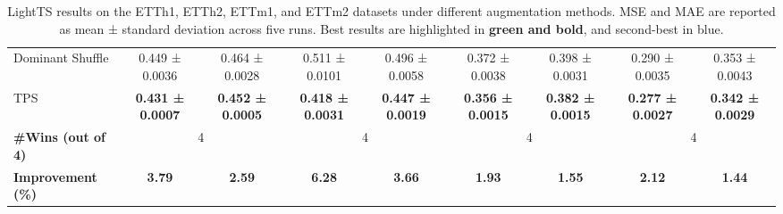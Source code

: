 \begin{table}[h!]
\begin{adjustbox}{max width=\textwidth}
\begin{tabular}{l|cc|cc|cc|cc}
        Dominant Shuffle   & 0.449 ± 0.0036 & \cellcolor{secondcolor}0.464 ± 0.0028 & 0.511 ± 0.0101 & 0.496 ± 0.0058 & 0.372 ± 0.0038 & 0.398 ± 0.0031 & 0.290 ± 0.0035 & 0.353 ± 0.0043  \\
    TPS           & \cellcolor{bestcolor}\textbf{0.431 ± 0.0007} & \cellcolor{bestcolor}\textbf{0.452 ± 0.0005} & \cellcolor{bestcolor}\textbf{0.418 ± 0.0031} & \cellcolor{bestcolor}\textbf{0.447 ± 0.0019} & \cellcolor{bestcolor}\textbf{0.356 ± 0.0015} & \cellcolor{bestcolor}\textbf{0.382 ± 0.0015} & \cellcolor{bestcolor}\textbf{0.277 ± 0.0027} & \cellcolor{bestcolor}\textbf{0.342 ± 0.0029} \\
    \midrule
    \textbf{\#Wins (out of 4)} & \multicolumn{2}{c|}{4} & \multicolumn{2}{c|}{4} & \multicolumn{2}{c|}{4} & \multicolumn{2}{c}{4} \\
    \textbf{Improvement (\%)} & \cellcolor{bestcolor} \textbf{3.79} & \cellcolor{bestcolor} \textbf{2.59} & \cellcolor{bestcolor} \textbf{6.28} & \cellcolor{bestcolor} \textbf{3.66} & \cellcolor{bestcolor} \textbf{1.93} & \cellcolor{bestcolor} 
    \textbf{1.55} & \cellcolor{bestcolor} \textbf{2.12} & \cellcolor{bestcolor} \textbf{1.44} \\
    \bottomrule
\end{tabular}
\end{adjustbox}
\caption{LightTS results on the ETTh1, ETTh2, ETTm1, and ETTm2 datasets under different augmentation methods. MSE and MAE are reported as mean ± standard deviation across five runs. Best results are highlighted in \textbf{green and bold}, and second-best in blue.}
\label{tb: lt1}
\end{table}



    

